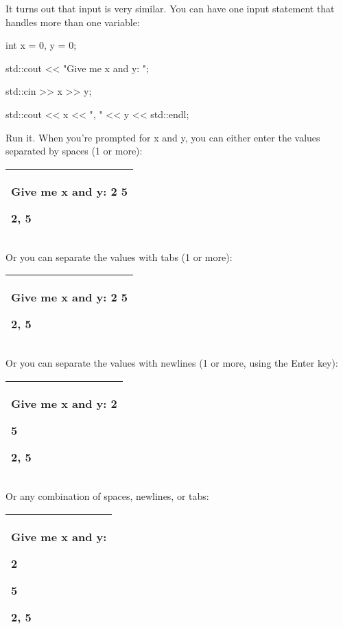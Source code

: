 \documentclass[
]{article}
\begin{document}
It turns out that input is very similar. You can have one input
statement that handles more than one variable:

int x = 0, y = 0;

std::cout \textless\textless{} "Give me x and y: ";

std::cin \textgreater\textgreater{} x \textgreater\textgreater{} y;

std::cout \textless\textless{} x \textless\textless{} ", "
\textless\textless{} y \textless\textless{} std::endl;

Run it. When you're prompted for x and y, you can either enter the
values separated by spaces (1 or more):

\begin{longtable}[]{@{}l@{}}
\toprule
\endhead
\begin{minipage}[t]{0.97\columnwidth}\raggedright
Give me x and y: \textbf{2 5}

2, 5\strut
\end{minipage}\tabularnewline
\bottomrule
\end{longtable}

Or you can separate the values with tabs (1 or more):

\begin{longtable}[]{@{}l@{}}
\toprule
\endhead
\begin{minipage}[t]{0.97\columnwidth}\raggedright
Give me x and y: \textbf{2 5}

2, 5\strut
\end{minipage}\tabularnewline
\bottomrule
\end{longtable}

Or you can separate the values with newlines (1 or more, using the Enter
key):

\begin{longtable}[]{@{}l@{}}
\toprule
\endhead
\begin{minipage}[t]{0.97\columnwidth}\raggedright
Give me x and y: \textbf{2}

5

2, 5\strut
\end{minipage}\tabularnewline
\bottomrule
\end{longtable}

Or any combination of spaces, newlines, or tabs:

\begin{longtable}[]{@{}l@{}}
\toprule
\endhead
\begin{minipage}[t]{0.97\columnwidth}\raggedright
Give me x and y:

2

5

2, 5\strut
\end{minipage}\tabularnewline
\bottomrule
\end{longtable}
\end{document}
